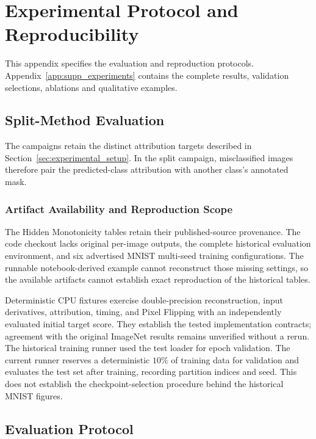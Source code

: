 \appendix
\chapter{Experimental Protocol and Reproducibility}\label{app:extended_results}

This appendix specifies the evaluation and reproduction protocols. Appendix~\ref{app:supp_experiments} contains the complete results, validation selections, ablations and qualitative examples.

\section{Split-Method Evaluation}

The campaigns retain the distinct attribution targets described in Section~\ref{sec:experimental_setup}. In the split campaign, misclassified images therefore pair the predicted-class attribution with another class's annotated mask.

\subsection{Artifact Availability and Reproduction Scope}\label{app:hm_artifact_scope}

The Hidden Monotonicity tables retain their published-source provenance. The code checkout lacks original per-image outputs, the complete historical evaluation environment, and six advertised MNIST multi-seed training configurations. The runnable notebook-derived example cannot reconstruct those missing settings, so the available artifacts cannot establish exact reproduction of the historical tables.

Deterministic CPU fixtures exercise double-precision reconstruction, input derivatives, attribution, timing, and Pixel Flipping with an independently evaluated initial target score. They establish the tested implementation contracts; agreement with the original ImageNet results remains unverified without a rerun. The historical training runner used the test loader for epoch validation. The current runner reserves a deterministic $10\%$ of training data for validation and evaluates the test set after training, recording partition indices and seed. This does not establish the checkpoint-selection procedure behind the historical MNIST figures.

\section{Evaluation Protocol}\label{ptnb:app:protocol}

